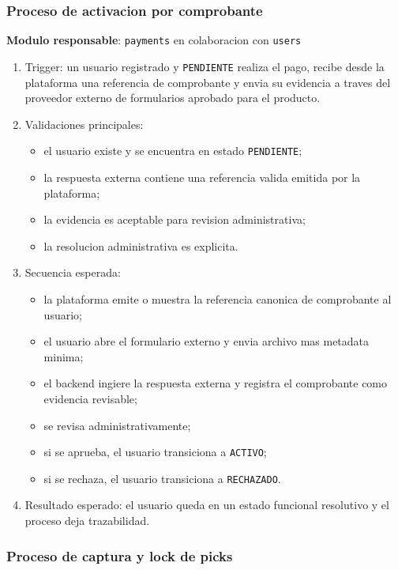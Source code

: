 \subsubsection{Proceso de activacion por comprobante}

\textbf{Modulo responsable}: \texttt{payments} en colaboracion con \texttt{users}

\begin{enumerate}
  \item Trigger: un usuario registrado y \texttt{PENDIENTE} realiza el pago, recibe desde la plataforma una referencia de comprobante y envia su evidencia a traves del proveedor externo de formularios aprobado para el producto.
  \item Validaciones principales:
    \begin{itemize}
      \item el usuario existe y se encuentra en estado \texttt{PENDIENTE};
      \item la respuesta externa contiene una referencia valida emitida por la plataforma;
      \item la evidencia es aceptable para revision administrativa;
      \item la resolucion administrativa es explicita.
    \end{itemize}
  \item Secuencia esperada:
    \begin{itemize}
      \item la plataforma emite o muestra la referencia canonica de comprobante al usuario;
      \item el usuario abre el formulario externo y envia archivo mas metadata minima;
      \item el backend ingiere la respuesta externa y registra el comprobante como evidencia revisable;
      \item se revisa administrativamente;
      \item si se aprueba, el usuario transiciona a \texttt{ACTIVO};
      \item si se rechaza, el usuario transiciona a \texttt{RECHAZADO}.
    \end{itemize}
  \item Resultado esperado: el usuario queda en un estado funcional resolutivo y el proceso deja trazabilidad.
\end{enumerate}

\subsubsection{Proceso de captura y lock de picks}

